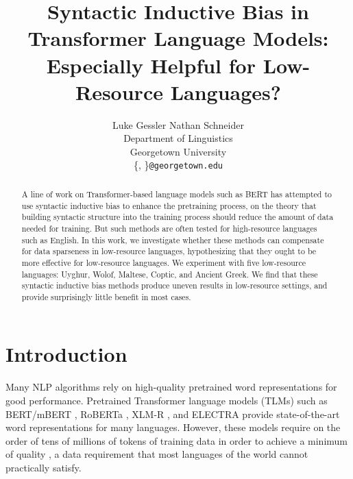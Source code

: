 \documentclass[11pt]{article}
\title{Syntactic Inductive Bias in Transformer Language Models:\\ Especially Helpful for Low-Resource Languages?}
\author{Luke Gessler \quad Nathan Schneider \\
  Department of Linguistics \\
  Georgetown University \\
  \{\emldisplay{lg876@georgetown.edu}{lg876}, \emldisplay{nathan.schneider@georgetown.edu}{nathan.schneider}\}\texttt{@georgetown.edu} \\}
\begin{document}
\maketitle

\begin{abstract}
A line of work on Transformer-based language models such as BERT %
has attempted to use syntactic inductive bias to enhance the pretraining process, %
on the theory that building syntactic structure into the training process should reduce the amount of data needed for training.
But such methods are often tested for high-resource languages such as English. %
In this work, we investigate whether these methods can compensate for data sparseness in low-resource languages, hypothesizing that they ought to be more effective for low-resource languages.
We experiment with five low-resource languages: Uyghur, Wolof, Maltese, Coptic, and Ancient Greek.
We find that these syntactic inductive bias methods produce uneven results in low-resource settings, and provide surprisingly little benefit in most cases.
\end{abstract}

\def\CodeRepo{
\url{https://github.com/lgessler/lr-sib}
}

\def\wordtovec{\textsc{word2vec}}
\def\mbert{\textsc{mbert}}
\def\mbertva{\textsc{mbert-va}}
\def\m{$\upmu$\textsc{b-m}}
\def\mp{$\upmu$\textsc{b-mp}}
\def\mt{$\upmu$\textsc{b-mt}}
\def\mpt{$\upmu$\textsc{b-mpt}}
\def\mptsla{$\upmu$\textsc{b-mpt-sla}}
\def\mx{$\upmu$\textsc{b-mx}}
\def\mxp{$\upmu$\textsc{b-mxp}}
\def\mxt{$\upmu$\textsc{b-mxt}}
\def\mxpt{$\upmu$\textsc{b-mxpt}}
\def\mxptsla{$\upmu$\textsc{b-mxpt-sla}}
\def\np{\textsc{-np}}
\def\pp{\textsc{-pp}}
\def\hqp{\textsc{-hqp}}
\def\bd{\textsc{-bd}}
\def\bm{\textsc{-bm}}

\section{Introduction}
Many NLP algorithms rely on high-quality pretrained word representations for good performance.
Pretrained Transformer language models (TLMs) such as BERT/mBERT \citep{devlin_bert_2019}, RoBERTa \citep{liu_roberta_2019}, XLM-R \citep{conneau_unsupervised_2020}, and ELECTRA \citep{clark_electra_2020} provide state-of-the-art word representations for many languages. 
However, these models require on the order of tens of millions of tokens of training data in order to achieve a minimum of quality \citep{micheli_importance_2020,warstadt_learning_2020}, a data requirement that most languages of the world cannot practically satisfy. 
\end{document}
